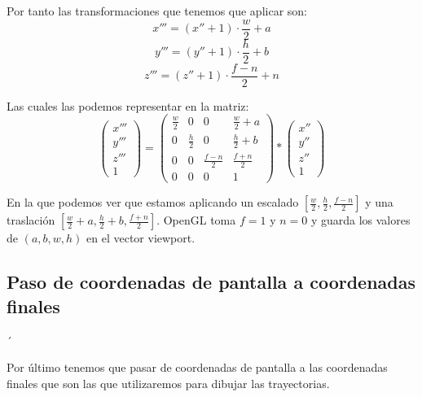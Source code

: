 \documentclass[a4paper,11pt, oneside]{book}
\begin{document}
Por tanto las transformaciones que tenemos que aplicar son:
\begin{equation}
x''' = (x''+1)\cdot \frac{w}{2}+a
\end{equation}
\begin{equation}
y''' = (y''+1)\cdot \frac{h}{2}+b
\end{equation}
\begin{equation}
z''' = (z''+1)\cdot \frac{f-n}{2}+n
\end{equation}

Las cuales las podemos representar en la matriz:
\begin{equation}
\begin{pmatrix}
x'''\\
y'''\\
z'''\\
1
\end{pmatrix} =
\begin{pmatrix}
\frac{w}{2} &0&0&\frac{w}{2}+a\\
0&\frac{h}{2} &0&\frac{h}{2}+b\\
0&0&\frac{f-n}{2} & \frac{f+n}{2}\\
0&0&0&1
\end{pmatrix}
*\begin{pmatrix}
x''\\
y''\\
z''\\
1
\end{pmatrix}
\end{equation}

En la que podemos ver que estamos aplicando un escalado $[\frac{w}{2}, \frac{h}{2}, \frac{f-n}{2}]$ y una traslación $[\frac{w}{2}+a, \frac{h}{2}+b, \frac{f+n}{2}]$. OpenGL toma $f=1$ y $n=0$ y guarda los valores de $(a,b,w,h)$ en el vector viewport. 

\subsection{Paso de coordenadas de pantalla a coordenadas finales}´

Por último tenemos que pasar de coordenadas de pantalla a las coordenadas  finales que son las que utilizaremos para dibujar las trayectorias.
\end{document}
